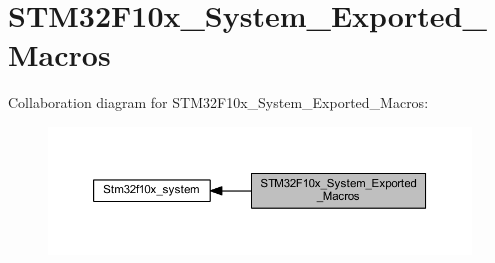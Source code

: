 \hypertarget{group___s_t_m32_f10x___system___exported___macros}{}\section{S\+T\+M32\+F10x\+\_\+\+System\+\_\+\+Exported\+\_\+\+Macros}
\label{group___s_t_m32_f10x___system___exported___macros}
Collaboration diagram for S\+T\+M32\+F10x\+\_\+\+System\+\_\+\+Exported\+\_\+\+Macros\+:
\nopagebreak
\begin{figure}[H]
\begin{center}
\leavevmode
\includegraphics[width=350pt]{group___s_t_m32_f10x___system___exported___macros}
\end{center}
\end{figure}
